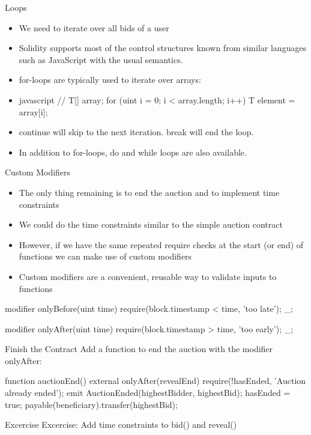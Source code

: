 \documentclass[]{beamer}
\begin{document}
\begin{frame}{Loops}
	\begin{itemize}
		\item We need to iterate over all bids of a user
		\item Solidity supports most of the control structures known from similar languages such as JavaScript with the usual semantics.
		\item for-loops are typically used to iterate over arrays:
		\item javascript
			// T[]  array;
			for (uint i = 0; i < array.length; i++) {
			 	T  element = array[i];
			}
		\item continue will skip to the next iteration. break will end the loop.
		\item In addition to for-loops, do and while loops are also available.
	\end{itemize}

	
\end{frame}

\begin{frame}{Custom Modifiers}
	\begin{itemize}
		\item The only thing remaining is to end the auction and to implement time constraints
		\item We could do the time constraints similar to the simple auction contract
		\item However, if we have the same repeated require checks at the start (or end) of functions we can make use of custom modifiers
		\item Custom modifiers are a convenient, reusable way to validate inputs to functions
	\end{itemize}
	
	modifier onlyBefore(uint time) {
    require(block.timestamp < time, 'too late');
    _;
}

modifier onlyAfter(uint time) {
    require(block.timestamp > time, 'too early');
    _;
}	
\end{frame}

\begin{frame}{Finish the Contract}
	Add a function to end the auction with the modifier onlyAfter:

	function auctionEnd() external onlyAfter(revealEnd) {
  require(!hasEnded, 'Auction already ended');
  emit AuctionEnded(highestBidder, highestBid);
  hasEnded = true;
  payable(beneficiary).transfer(highestBid);
}
\end{frame}

\begin{frame}{Excercise}
	Excercise: Add time constraints to bid() and reveal()
\end{frame}
\end{document}
